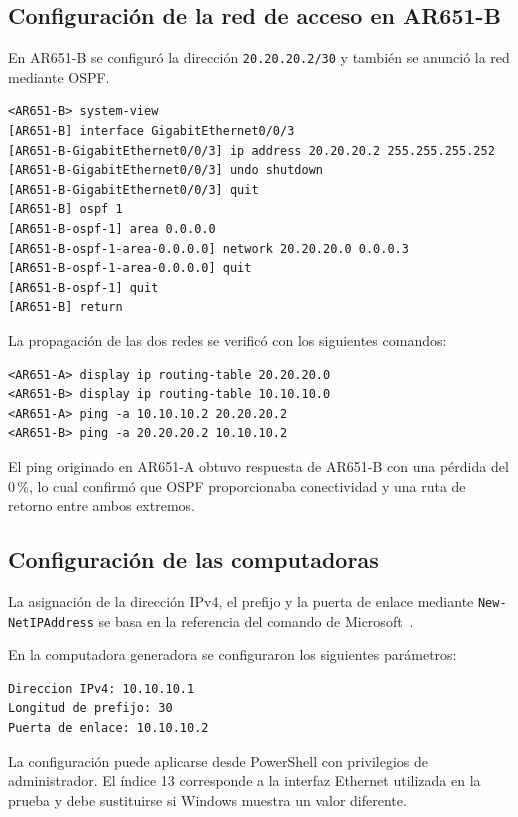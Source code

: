 \subsection{Configuración de la red de acceso en AR651-B}

En AR651-B se configuró la dirección \texttt{20.20.20.2/30} y también se
anunció la red mediante OSPF.

\begin{lstlisting}[style=terminal]
<AR651-B> system-view
[AR651-B] interface GigabitEthernet0/0/3
[AR651-B-GigabitEthernet0/0/3] ip address 20.20.20.2 255.255.255.252
[AR651-B-GigabitEthernet0/0/3] undo shutdown
[AR651-B-GigabitEthernet0/0/3] quit
[AR651-B] ospf 1
[AR651-B-ospf-1] area 0.0.0.0
[AR651-B-ospf-1-area-0.0.0.0] network 20.20.20.0 0.0.0.3
[AR651-B-ospf-1-area-0.0.0.0] quit
[AR651-B-ospf-1] quit
[AR651-B] return
\end{lstlisting}

La propagación de las dos redes se verificó con los siguientes comandos:

\begin{lstlisting}[style=terminal]
<AR651-A> display ip routing-table 20.20.20.0
<AR651-B> display ip routing-table 10.10.10.0
<AR651-A> ping -a 10.10.10.2 20.20.20.2
<AR651-B> ping -a 20.20.20.2 10.10.10.2
\end{lstlisting}

El ping originado en AR651-A obtuvo respuesta de AR651-B con una pérdida del
0\,\%, lo cual confirmó que OSPF proporcionaba conectividad y una ruta de
retorno entre ambos extremos.

\subsection{Configuración de las computadoras}

La asignación de la dirección IPv4, el prefijo y la puerta de enlace mediante
\texttt{New-NetIPAddress} se basa en la referencia del comando de
Microsoft~\cite{microsoft-new-netipaddress}.

En la computadora generadora se configuraron los siguientes parámetros:

\begin{lstlisting}[style=terminal]
Direccion IPv4: 10.10.10.1
Longitud de prefijo: 30
Puerta de enlace: 10.10.10.2
\end{lstlisting}

La configuración puede aplicarse desde PowerShell con privilegios de
administrador. El índice 13 corresponde a la interfaz Ethernet utilizada en
la prueba y debe sustituirse si Windows muestra un valor diferente.

